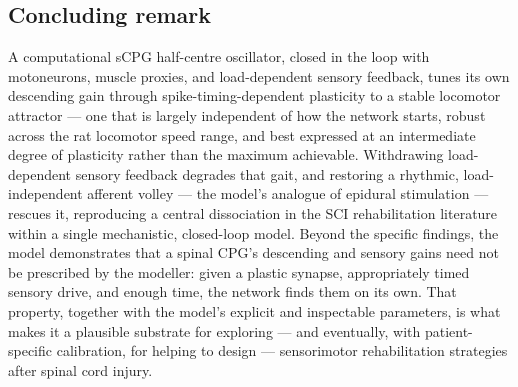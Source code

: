 \subsection{Concluding remark}
A computational sCPG half-centre oscillator, closed in the loop with
motoneurons, muscle proxies, and load-dependent sensory feedback, tunes its
own descending gain through spike-timing-dependent plasticity to a stable
locomotor attractor --- one that is largely independent of how the network
starts, robust across the rat locomotor speed range, and best expressed at
an intermediate degree of plasticity rather than the maximum
achievable. Withdrawing load-dependent sensory feedback degrades that gait,
and restoring a rhythmic, load-independent afferent volley --- the model's
analogue of epidural stimulation --- rescues it, reproducing a central
dissociation in the SCI rehabilitation literature within a single
mechanistic, closed-loop model. Beyond the specific findings, the model
demonstrates that a spinal CPG's descending and sensory gains need not be
prescribed by the modeller: given a plastic synapse, appropriately timed
sensory drive, and enough time, the network finds them on its own. That
property, together with the model's explicit and inspectable parameters,
is what makes it a plausible substrate for exploring --- and eventually,
with patient-specific calibration, for helping to design --- sensorimotor
rehabilitation strategies after spinal cord injury.
